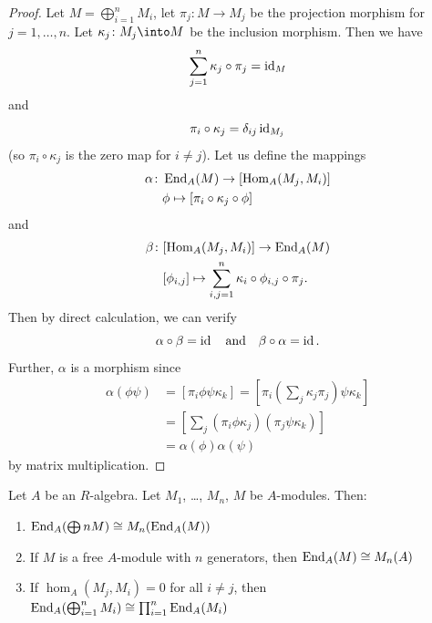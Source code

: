 \begin{proof}
Let $M=\bigoplus^{n}_{i=1}M_{i}$, let $\pi_{j}\colon M\to M_{j}$ be
the projection morphism for $j=1,\dots,n$. Let $\kappa_{j}\colon M_{j}\into M$
be the inclusion morphism. Then we have
\begin{equation}
\sum^{n}_{j=1}\kappa_{j}\circ\pi_{j}=\operatorname{id}_{M}
\end{equation}
and
\begin{equation}
\pi_{i}\circ\kappa_{j}=\delta_{ij}\operatorname{id}_{M_{j}}
\end{equation}
(so $\pi_{i}\circ\kappa_{j}$ is the zero map for $i\neq j$). Let us
define the mappings
\begin{equation}
\begin{split}
\alpha\colon&\operatorname{End}_{A}(M)\to[\operatorname{Hom}_{A}(M_{j},M_{i})]\\
&\phi\mapsto[\pi_{i}\circ\kappa_{j}\circ\phi]
\end{split}
\end{equation}
and
\begin{equation}
\begin{split}
\beta\colon&[\operatorname{Hom}_{A}(M_{j},M_{i})]\to\operatorname{End}_{A}(M)\\
&[\phi_{i,j}]\mapsto\sum^{n}_{i,j=1}\kappa_{i}\circ\phi_{i,j}\circ\pi_{j}.
\end{split}
\end{equation}
Then by direct calculation, we can verify
\begin{equation}
\alpha\circ\beta=\operatorname{id}\quad\mbox{and}\quad\beta\circ\alpha=\operatorname{id}.
\end{equation}
Further, $\alpha$ is a morphism since
\begin{subequations}
  \begin{align}
\alpha(\phi\psi) &= [\pi_{i}\phi\psi\kappa_{k}] = [\pi_{i}(\sum_{j}\kappa_{j}\pi_{j})\psi\kappa_{k}]\\
&=[\sum_{j}(\pi_{i}\phi\kappa_{j})(\pi_{j}\psi\kappa_{k})]\\
&=\alpha(\phi)\alpha(\psi)
  \end{align}
\end{subequations}
by matrix multiplication.
\end{proof}

\begin{corollary}\label{cor:3.18}
Let $A$ be an $R$-algebra. Let $M_{1}$, \dots, $M_{n}$, $M$ be
$A$-modules. Then:
\begin{enumerate}
\item $\operatorname{End}_{A}(\bigoplus nM)\cong M_{n}(\operatorname{End}_{A}(M))$
\item If $M$ is a free $A$-module with $n$ generators, then
  $\operatorname{End}_{A}(M)\cong M_{n}(A)$
\item If $\hom_{A}(M_{j},M_{i})=0$ for all $i\neq j$, then
  $\operatorname{End}_{A}(\bigoplus^{n}_{i=1}M_{i})\cong\prod^{n}_{i=1}\operatorname{End}_{A}(M_{i})$
\end{enumerate}
\end{corollary}


